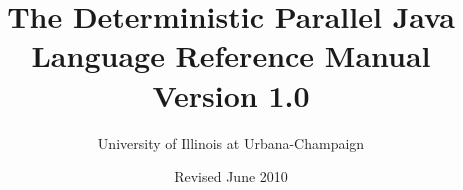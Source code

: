 \documentclass[10pt]{article}
\title{\bfseries{The Deterministic Parallel Java \\
Language Reference Manual \\
Version 1.0}}
\author{University of Illinois at Urbana-Champaign}
\date{Revised June 2010}
\begin{document}
\maketitle

\tableofcontents{}

\begin{sloppypar}








\end{sloppypar}
\end{document}
